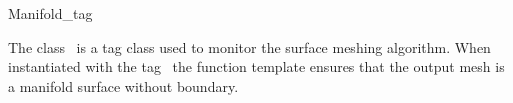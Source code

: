 

\begin{ccRefClass}{Manifold_tag}  %


\ccDefinition
  
The class \ccRefName\ is a tag class used to monitor the
surface meshing algorithm. When instantiated with the tag
\ccRefName\, the function template
ensures that the output mesh  is a  manifold surface
without boundary.











\ccSeeAlso

\\
 \\





\end{ccRefClass}


